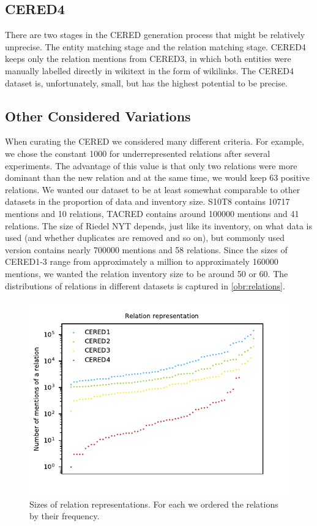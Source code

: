 \subsection{CERED4}
There are two stages in the CERED generation process that might be relatively unprecise. The entity matching stage and the relation matching stage. CERED4 keeps only the relation mentions from CERED3, in which both entities were manually labelled directly in wikitext in the form of wikilinks. The CERED4 dataset is, unfortunately, small, but has the highest potential to be precise.


%


\subsection{Other Considered Variations}
\label{sec:otherconsideredvariations}
When curating the CERED we considered many different criteria. For example, we chose the constant \num{1000} for underrepresented relations after several experiments. The advantage of this value is that only two relations were more dominant than the new  relation and at the same time, we would keep 63 positive relations. We wanted our dataset to be at least somewhat comparable to other datasets in the proportion of data and inventory size. S10T8 contains \num{10717} mentions and 10 relations, TACRED contains around \num{100000} mentions and 41 relations. The size of Riedel NYT depends, just like its inventory, on what data is used (and whether duplicates are removed and so on), but commonly used version contains nearly \num{700000} mentions and 58 relations. Since the sizes of CERED1-3 range from approximately a million to approximately \num{160000} mentions, we wanted the relation inventory size to be around 50 or 60. The distributions of relations in different datasets is captured in \autoref{obr:relations}. 



\begin{figure}[h]\centering
\includegraphics[scale=1]{./img/Relations1-4}
\caption{Sizes of relation representations. For each we ordered the relations by their frequency.}
\label{obr:relations}
\end{figure}


